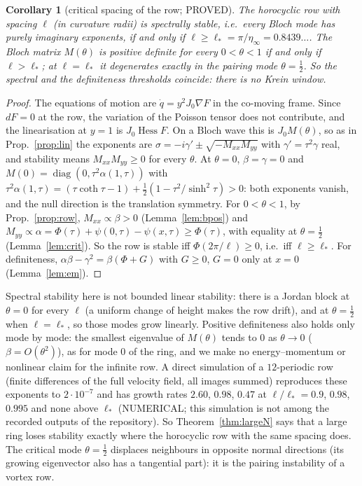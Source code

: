 \documentclass[11pt]{article}
\newtheorem{corollary}[theorem]{Corollary}
\theoremstyle{remark}
\begin{document}
\begin{corollary}[critical spacing of the row; PROVED]\label{cor:row}
The horocyclic row with spacing $\ell$ (in curvature radii) is spectrally stable, i.e.\ every Bloch mode has purely
imaginary exponents, if and only if $\ell\ge\ell_*=\pi/\eta_\infty=0.8439\ldots$. The Bloch matrix $M(\theta)$ is positive
definite for every $0<\theta<1$ if and only if $\ell>\ell_*$; at $\ell=\ell_*$ it degenerates exactly in the pairing mode
$\theta=\frac12$. So the spectral and the definiteness thresholds coincide: there is no Krein window.
\end{corollary}
\begin{proof}
The equations of motion are $\dot q=y^2J_0\nabla F$ in the co-moving frame. Since $dF=0$ at the row, the variation of the
Poisson tensor does not contribute, and the linearisation at $y=1$ is $J_0\operatorname{Hess}F$. On a Bloch wave this is
$J_0M(\theta)$, so as in Prop.~\ref{prop:lin} the exponents are $\sigma=-i\gamma'\pm\sqrt{-M_{xx}M_{yy}}$ with $\gamma'=\tau^2\gamma$
real, and stability means $M_{xx}M_{yy}\ge0$ for every $\theta$. At $\theta=0$, $\beta=\gamma=0$ and
$M(0)=\operatorname{diag}(0,\tau^2\alpha(1,\tau))$ with $\tau^2\alpha(1,\tau)=(\tau\coth\tau-1)+\frac12(1-\tau^2/\sinh^2\tau)>0$: both
exponents vanish, and the null direction is the translation symmetry. For $0<\theta<1$, by
Prop.~\ref{prop:row}, $M_{xx}\propto\beta>0$ (Lemma~\ref{lem:bpos}) and $M_{yy}\propto\alpha=\Phi(\tau)+\psi(0,\tau)-\psi(x,\tau)\ge\Phi(\tau)$,
with equality at $\theta=\frac12$ (Lemma~\ref{lem:crit}). So the row is stable iff $\Phi(2\pi/\ell)\ge0$, i.e.\ iff $\ell\ge\ell_*$.
For definiteness, $\alpha\beta-\gamma^2=\beta(\Phi+G)$ with $G\ge0$, $G=0$ only at $x=0$ (Lemma~\ref{lem:em}).
\end{proof}
Spectral stability here is not bounded linear stability: there is a Jordan block at $\theta=0$ for every $\ell$ (a uniform
change of height makes the row drift), and at $\theta=\frac12$ when $\ell=\ell_*$, so those modes grow linearly. Positive
definiteness also holds only mode by mode: the smallest eigenvalue of $M(\theta)$ tends to $0$ as $\theta\to0$
($\beta=O(\theta^2)$), as for mode $0$ of the ring, and we make no energy--momentum or nonlinear claim for the infinite row.
A direct simulation of a $12$-periodic row (finite differences of the full velocity field, all images summed) reproduces
these exponents to $2\cdot10^{-7}$ and has growth rates $2.60$, $0.98$, $0.47$ at $\ell/\ell_*=0.9$, $0.98$, $0.995$ and none
above $\ell_*$ (NUMERICAL; this simulation is not among the recorded outputs of the repository).
So Theorem~\ref{thm:largeN} says that a large ring loses stability exactly where the horocyclic row with the same
spacing does. The critical mode $\theta=\frac12$ displaces neighbours in opposite normal directions (its growing
eigenvector also has a tangential part): it is the pairing instability of a vortex row.
\end{document}
